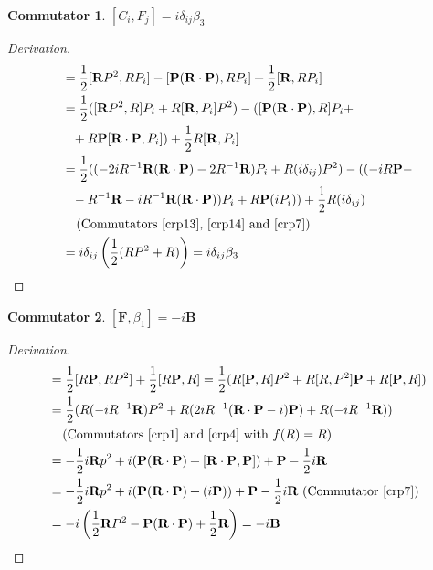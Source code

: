 \documentclass[12pt,a4paper]{report}
\theoremstyle{definition}
\newtheorem{commutator}{Commutator}[section]
\newenvironment{derivation}
  {\renewcommand\qedsymbol{$\square$}\begin{proof}[Derivation]}
  {\end{proof}}
\theoremstyle{remark}
\theoremstyle{remark}
\begin{document}
\begin{appendices}
\begin{commutator}\label{cf3}
$[C_i,F_j]=i\delta_{ij}\beta_3$
\end{commutator}
\begin{derivation}
\begin{align*}
[C_i,F_j]&=\frac{1}{2}[\textbf{R}P^2,RP_i]-[\textbf{P}(\textbf{R}\cdot\textbf{P}),RP_i]+\frac{1}{2}[\textbf{R},RP_i]\\
&=\frac{1}{2}([\textbf{R}P^2,R]P_i+R[\textbf{R},P_i]P^2)-([\textbf{P}(\textbf{R}\cdot\textbf{P}),R]P_i+\\
&\phantom{=}+R\textbf{P}[\textbf{R}\cdot\textbf{P},P_i])+\frac{1}{2}R[\textbf{R},P_i]\\
&=\frac{1}{2}((-2iR^{-1}\textbf{R}(\textbf{R}\cdot\textbf{P})-2R^{-1}\textbf{R})P_i+R(i\delta_{ij})P^2)-((-iR\textbf{P}-\\
&\phantom{=}-R^{-1}\textbf{R}-iR^{-1}\textbf{R}(\textbf{R}\cdot\textbf{P}))P_i+R\textbf{P}(iP_i))+\frac{1}{2}R(i\delta_{ij})\\
&\phantom{=}\text{ (Commutators~\ref{crp13},~\ref{crp14} and~\ref{crp7})}\\
&=i\delta_{ij}\left(\frac{1}{2}(RP^2+R)\right)=i\delta_{ij}\beta_3
\end{align*}
\end{derivation}

\begin{commutator}\label{cf4}
$[\textbf{F},\beta_1]=-i\textbf{B}$
\end{commutator}
\begin{derivation}
\begin{align*}
[\textbf{F},\beta_1]&=\frac{1}{2}[R\textbf{P},RP^2]+\frac{1}{2}[R\textbf{P},R]=\frac{1}{2}(R[\textbf{P},R]P^2+R[R,P^2]\textbf{P}+R[\textbf{P},R])\\
&=\frac{1}{2}(R(-iR^{-1}\textbf{R})P^2+R(2iR^{-1}(\textbf{R}\cdot\textbf{P}-i)\textbf{P})+R(-iR^{-1}\textbf{R}))\\
&\phantom{=}\text{ (Commutators~\ref{crp1} and~\ref{crp4} with }f(R)=R)\\
&=-\frac{1}{2}i\textbf{R}p^2+i(\textbf{P}(\textbf{R}\cdot\textbf{P})+[\textbf{R}\cdot\textbf{P},\textbf{P}])+\textbf{P}-\frac{1}{2}i\textbf{R}\\
&=-\frac{1}{2}i\textbf{R}p^2+i(\textbf{P}(\textbf{R}\cdot\textbf{P})+(i\textbf{P}))+\textbf{P}-\frac{1}{2}i\textbf{R} \text{ (Commutator~\ref{crp7})}\\
&=-i\left(\frac{1}{2}\textbf{R}P^2-\textbf{P}(\textbf{R}\cdot\textbf{P})+\frac{1}{2}\textbf{R}\right)=-i\textbf{B}
\end{align*}
\end{derivation}


\end{appendices}
\end{document}
